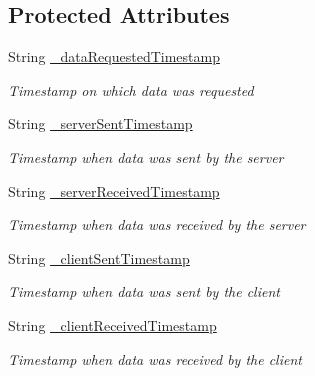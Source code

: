 \subsection*{Protected Attributes}
\begin{DoxyCompactItemize}
\item 
String \hyperlink{class_web_analyzer_1_1_models_1_1_base_1_1_basic_data_aa600b76f390c856cbe15c8ba6bd7ccf8}{\+\_\+data\+Requested\+Timestamp}
\begin{DoxyCompactList}\small\item\em Timestamp on which data was requested \end{DoxyCompactList}\item 
String \hyperlink{class_web_analyzer_1_1_models_1_1_base_1_1_basic_data_adc90ecba185e25a316a86a03f354f4ff}{\+\_\+server\+Sent\+Timestamp}
\begin{DoxyCompactList}\small\item\em Timestamp when data was sent by the server \end{DoxyCompactList}\item 
String \hyperlink{class_web_analyzer_1_1_models_1_1_base_1_1_basic_data_aa7dac12776bc5b2bbde67ba075b2fe00}{\+\_\+server\+Received\+Timestamp}
\begin{DoxyCompactList}\small\item\em Timestamp when data was received by the server \end{DoxyCompactList}\item 
String \hyperlink{class_web_analyzer_1_1_models_1_1_base_1_1_basic_data_af7624b281535382cf49d15dd9faddf47}{\+\_\+client\+Sent\+Timestamp}
\begin{DoxyCompactList}\small\item\em Timestamp when data was sent by the client \end{DoxyCompactList}\item 
String \hyperlink{class_web_analyzer_1_1_models_1_1_base_1_1_basic_data_a9bbe1d03f8e822eb5c6ff47cea03c46e}{\+\_\+client\+Received\+Timestamp}
\begin{DoxyCompactList}\small\item\em Timestamp when data was received by the client \end{DoxyCompactList}\end{DoxyCompactItemize}

